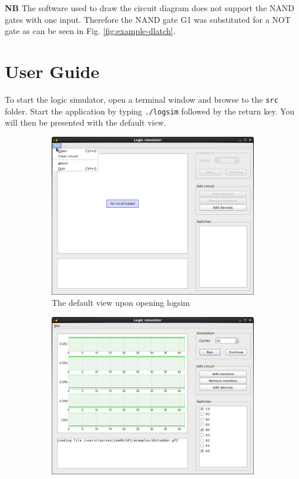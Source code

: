 \documentclass[a4paper,10pt]{article}
\begin{document}
\textbf{NB} The software used to draw the circuit diagram does not support the NAND gates with one input. Therefore the NAND gate G1 was substituted for a NOT gate as can be seen in Fig. \ref{fig:example-dlatch}.

\pagebreak

\section{User Guide}

To start the logic simulator, open a terminal window and browse to the \texttt{src} folder. Start the application by typing \texttt{./logsim} followed by the return key. You will then be presented with the default view.

\begin{figure}[h]
		\centering
        \begin{subfigure}[h]{0.4\textwidth}
                \centering
                \includegraphics[width=\textwidth]{default}
                \caption{The default view upon opening logsim}
                \label{fig:default}
        \end{subfigure}
        \begin{subfigure}[h]{0.4\textwidth}
                \centering
                \includegraphics[width=\textwidth]{simulation}

\end{subfigure}
\end{figure}
\end{document}
